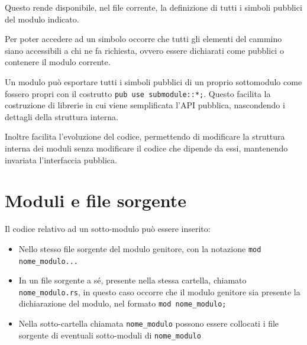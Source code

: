 Questo rende disponibile, nel file corrente, la definizione di tutti i simboli
pubblici del modulo indicato.


Per poter accedere ad un simbolo occorre che tutti gli elementi del cammino
siano accessibili a chi ne fa richiesta, ovvero essere dichiarati come pubblici
o contenere il modulo corrente.\newline

Un modulo può esportare tutti i simboli pubblici di un proprio sottomodulo come
fossero propri con il costrutto \texttt{pub use submodule::*;}.
Questo facilita la costruzione di librerie in cui viene semplificata l'API
pubblica, nascondendo i dettagli della struttura interna.

Inoltre facilita l'evoluzione del codice, permettendo di modificare la struttura
interna dei moduli senza modificare il codice che dipende da essi, mantenendo
invariata l'interfaccia pubblica.



\section{Moduli e file sorgente}

Il codice relativo ad un sotto-modulo può essere inserito:

\begin{itemize}
  \item Nello stesso file sorgente del modulo genitore, con la notazione
        \texttt{mod nome_modulo{...}}
  \item In un file sorgente a sé, presente nella stessa cartella, chiamato
        \texttt{nome\_modulo.rs}, in questo caso occorre che il modulo genitore sia
        presente la dichiarazione del modulo, nel formato \texttt{mod nome_modulo;}
  \item Nella sotto-cartella chiamata \texttt{nome\_modulo} possono essere
        collocati i file sorgente di eventuali sotto-moduli di \texttt{nome\_modulo}
\end{itemize}



